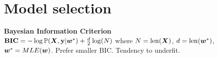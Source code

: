 \section*{Model selection}
\textbf{Bayesian Information Criterion}\\
$\mathbf{BIC}=-\log\mathbb{P}({\bm{X}}, {\mathbf{y}}|{\bm{w}}^*)+\frac{d}{2}\log(N)$ where $N=\mathrm{len}({\bm{X}})$, $d=\mathrm{len}({\bm{w}}^*)$, ${\bm{w}}^*=MLE({\bm{w}})$. Prefer smaller BIC. Tendency to underfit.\\
